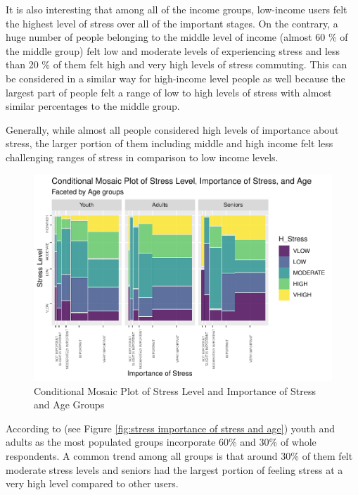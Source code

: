 \documentclass[
11pt, %
oneside, %
english, %
singlespacing, %
]{macthesis} %
\begin{document}
It is also interesting that among all of the income groups, low-income users felt the highest level of stress over all of the important stages. On the contrary, a huge number of people belonging to the middle level of income (almost 60 \% of the middle group) felt low and moderate levels of experiencing stress and less than 20 \% of them felt high and very high levels of stress commuting. This can be considered in a similar way for high-income level people as well because the largest part of people felt a range of low to high levels of stress with almost similar percentages to the middle group.

Generally, while almost all people considered high levels of importance about stress, the larger portion of them including middle and high income felt less challenging ranges of stress in comparison to low income levels.
\begin{figure}
\includegraphics[width=0.85\linewidth]{thesis_files/figure-latex/unnamed-chunk-30-1} \caption{\label{fig:stress importance of stress and age}Conditional Mosaic Plot of Stress Level and Importance of Stress and Age Groups}\label{fig:unnamed-chunk-30}
\end{figure}
According to (see Figure \ref{fig:stress importance of stress and age}) youth and adults as the most populated groups incorporate 60\% and 30\% of whole respondents. A common trend among all groups is that around 30\% of them felt moderate stress levels and seniors had the largest portion of feeling stress at a very high level compared to other users.
\end{document}
